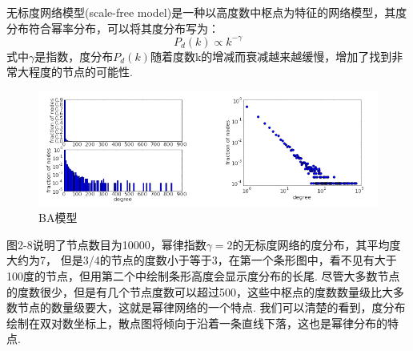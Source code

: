 \documentclass[bachelor,adobefonts]{jnuthesis}
\begin{document}










无标度网络模型(scale-free model)是一种以高度数中枢点为特征的网络模型，其度分布符合幂率分布，可以将其度分布写为：
\begin{equation}
  P_d(k) \propto k^{-\gamma}
\end{equation}
式中$\gamma $是指数，度分布$P_d(k)$随着度数k的增减而衰减越来越缓慢，增加了找到非常大程度的节点的可能性.


\begin{figure}[h!]
  \centering
  \includegraphics[width=1\linewidth]{BAmoxing.png}
  \caption{BA模型}
\end{figure}
图2-8说明了节点数目为10000，幂律指数$\gamma =2$的无标度网络的度分布，其平均度大约为7，
但是3/4的节点的度数小于等于3，在第一个条形图中，看不见有大于100度的节点，但用第二个中绘制条形高度会显示度分布的长尾.
尽管大多数节点的度数很少，但是有几个节点度数可以超过500，这些中枢点的度数数量级比大多数节点的数量级要大，这就是幂律网络的一个特点.
我们可以清楚的看到，度分布绘制在双对数坐标上，散点图将倾向于沿着一条直线下落，这也是幂律分布的特点.
\end{document}
